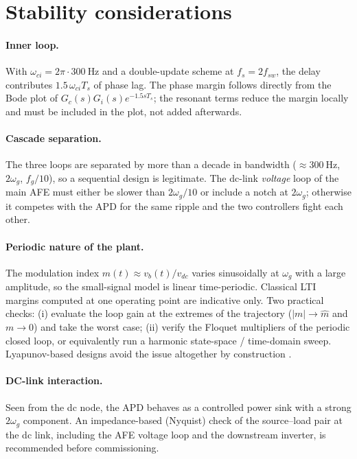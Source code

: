 \section{Stability considerations}

\paragraph{Inner loop.} With $\omega_{ci}=2\pi\cdot\SI{300}{\hertz}$ and a
double-update scheme at $f_s=2f_{sw}$, the delay contributes
$1.5\,\omega_{ci}T_s$ of phase lag. The phase margin follows directly from the
Bode plot of $G_c(s)G_i(s)e^{-1.5sT_s}$; the resonant terms reduce the margin
locally and must be included in the plot, not added afterwards.

\paragraph{Cascade separation.} The three loops are separated by more than a
decade in bandwidth ($\approx\SI{300}{\hertz}$, $2\omega_g$, $f_g/10$), so a
sequential design is legitimate. The dc-link \emph{voltage} loop of the main AFE
must either be slower than $2\omega_g/10$ or include a notch at $2\omega_g$;
otherwise it competes with the APD for the same ripple and the two controllers
fight each other.

\paragraph{Periodic nature of the plant.} The modulation index
$m(t)\approx v_b(t)/v_{dc}$ varies sinusoidally at $\omega_g$ with a large
amplitude, so the small-signal model is linear time-periodic. Classical LTI
margins computed at one operating point are indicative only. Two practical
checks: (i) evaluate the loop gain at the extremes of the trajectory
($|m|\to \hat m$ and $m\to 0$) and take the worst case; (ii) verify the Floquet
multipliers of the periodic closed loop, or equivalently run a harmonic
state-space / time-domain sweep. Lyapunov-based designs avoid the issue
altogether by construction \cite{liu2024lyapunov,yuan2019nonlinear}.

\paragraph{DC-link interaction.} Seen from the dc node, the APD behaves as a
controlled power sink with a strong $2\omega_g$ component. An impedance-based
(Nyquist) check of the source--load pair at the dc link, including the AFE
voltage loop and the downstream inverter, is recommended before commissioning.

